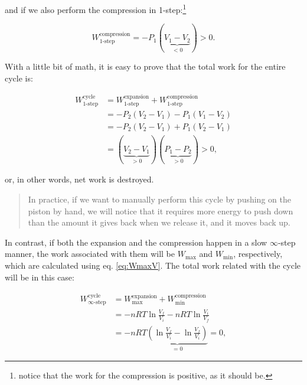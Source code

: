 \documentclass[
  9pt,
]{extbook}
\theoremstyle{definition}
\theoremstyle{definition}
\theoremstyle{definition}
\theoremstyle{remark}
\begin{document}
and if we also perform the compression in 1-step:\footnote{notice that the work for the compression is positive, as it should be.}

\begin{equation}
  W^{\text{compression}}_{\text{1-step}}=-P_1(\underbrace{V_1-V_2}_{<0})>0.
  \label{eq:Wcomp1}
\end{equation}

With a little bit of math, it is easy to prove that the total work for the entire cycle is:

\begin{equation}
\begin{aligned}
W^{\text{cycle}}_{\text{1-step}} {} & =  W^{\text{expansion}}_{\text{1-step}}+W^{\text{compression}}_{\text{1-step}} \\
 & = -P_2(V_2-V_1)-P_1(V_1-V_2) \\
 & = -P_2(V_2-V_1)+P_1(V_2-V_1) \\
 & = (\underbrace{V_2-V_1}_{>0})(\underbrace{P_1-P_2}_{>0}) > 0,
\end{aligned}
  \label{eq:Wtot1}
\end{equation}

or, in other words, net work is destroyed.

\begin{quote}
In practice, if we want to manually perform this cycle by pushing on the piston by hand, we will notice that it requires more energy to push down than the amount it gives back when we release it, and it moves back up.
\end{quote}

In contrast, if both the expansion and the compression happen in a slow \(\infty\)-step manner, the work associated with them will be \(W_{\text{max}}\) and \(W_{\text{min}}\), respectively, which are calculated using eq. \eqref{eq:WmaxV}. The total work related with the cycle will be in this case:

\begin{equation}
\begin{aligned}
W^{\text{cycle}}_{\infty\text{-step}} {} & = W^{\text{expansion}}_{\text{max}}+W^{\text{compression}}_{\text{min}} \\
 & = -nRT \ln \frac{V_f}{V_i}-nRT \ln \frac{V_i}{V_f} \\
 & = -nRT \underbrace{\left( \ln \frac{V_f}{V_i} - \ln \frac{V_f}{V_i} \right) }_{=0}  = 0,
\end{aligned}
  \label{eq:Wtot2}
\end{equation}
\end{document}
